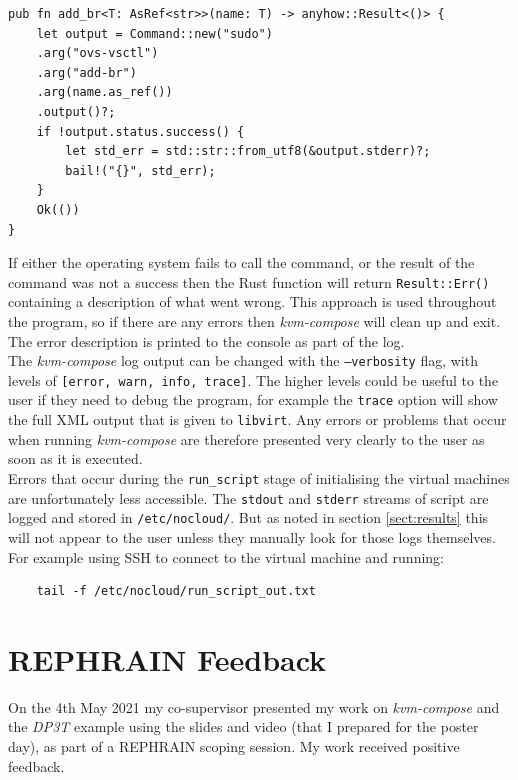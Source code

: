 \documentclass[
    author={Jacob Daniel Halsey},
    supervisor={Prof. Awais Rashid},
    degree={BSc},
    title={Building a Testbed for Evaluating Privacy Enhancing Technologies  (PETs)},
    subtitle={},
    type={software development},
    year={2021}
]{dissertation}
\begin{document}
\begin{lstlisting}
pub fn add_br<T: AsRef<str>>(name: T) -> anyhow::Result<()> {
    let output = Command::new("sudo")
    .arg("ovs-vsctl")
    .arg("add-br")
    .arg(name.as_ref())
    .output()?;
    if !output.status.success() {
        let std_err = std::str::from_utf8(&output.stderr)?;
        bail!("{}", std_err);
    }
    Ok(())
}
\end{lstlisting}
\vspace{1cm}

If either the operating system fails to call the command, or the result of the command was not
a success then the Rust function will return \lstinline|Result::Err()| containing a description
of what went wrong. This approach is used throughout the program, so if there are any errors
then \emph{kvm-compose} will clean up and exit. The error description is printed to the console
as part of the log.\\

The \emph{kvm-compose} log output can be changed with the \texttt{--verbosity} flag, with levels
of \texttt{[error, warn, info, trace]}. The higher levels could be useful to the user if
they need to debug the program, for example the \texttt{trace} option will show the full XML
output that is given to \texttt{libvirt}. Any errors or problems that occur when running
\emph{kvm-compose} are therefore presented very clearly to the user as soon as it is executed. \\

Errors that occur during the \texttt{run\_script} stage of initialising the virtual machines
are unfortunately less accessible. The \texttt{stdout} and \texttt{stderr} streams of script
are logged and stored in \texttt{/etc/nocloud/}. 
But as noted in section \ref{sect:results} this will not appear to the user unless they manually look
for those logs themselves. For example using SSH to connect to the virtual machine and running:

\begin{verbatim}
    tail -f /etc/nocloud/run_script_out.txt
\end{verbatim}


\section{REPHRAIN Feedback}

On the 4th May 2021 my co-supervisor presented my work on \emph{kvm-compose} and the \emph{DP3T} example
using the slides and video (that I prepared for the poster day), as part of a REPHRAIN scoping session.
My work received positive feedback.  \\
\end{document}
